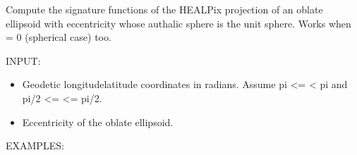 \documentclass[a4paper,12ptopenany,oneside,english]{sphinxmanual}
\begin{document}

\begin{fulllineitems}
\label{\detokenize{pj_healpix:rhealpixdggs.pj_healpix.healpix_ellipsoid}}
\pysigstartsignatures
{}
\pysigstopsignatures
\sphinxAtStartPar
Compute the signature functions of the HEALPix projection of an oblate
ellipsoid with eccentricity  whose authalic sphere is the unit sphere.
Works when  = 0 (spherical case) too.

\sphinxAtStartPar
INPUT:
\begin{itemize}
\item {} 
\sphinxAtStartPar
{} \sphinxhyphen{} Geodetic longitude\sphinxhyphen{}latitude coordinates in radians.
Assume \sphinxhyphen{}pi \textless{}=  \textless{} pi and \sphinxhyphen{}pi/2 \textless{}=  \textless{}= pi/2.

\item {} 
\sphinxAtStartPar
{} \sphinxhyphen{} Eccentricity of the oblate ellipsoid.

\end{itemize}

\sphinxAtStartPar
EXAMPLES:

\begin{sphinxVerbatim}[commandchars=\\\{\}]
  
   
\end{sphinxVerbatim}

\end{fulllineitems}
\end{document}
